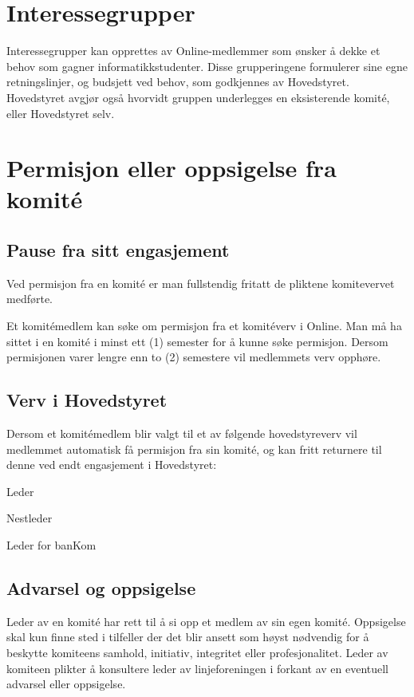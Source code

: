 \section{Interessegrupper}{
Interessegrupper kan opprettes av Online-medlemmer som ønsker å dekke et behov som gagner informatikkstudenter. Disse grupperingene formulerer sine egne retningslinjer, og budsjett ved behov, som godkjennes av Hovedstyret. Hovedstyret avgjør også hvorvidt gruppen underlegges en eksisterende komité, eller Hovedstyret selv. 
}

\section{Permisjon eller oppsigelse fra komité\newline} 

\subsection{Pause fra sitt engasjement}{
Ved permisjon fra en komité er man fullstendig fritatt de pliktene komitevervet medførte. 

Et komitémedlem kan søke om permisjon fra et komitéverv i Online. Man må ha sittet i en komité i minst ett (1) semester for å kunne søke permisjon. Dersom permisjonen varer lengre enn to (2) semestere vil medlemmets verv opphøre.
}

\subsection{Verv i Hovedstyret}{
Dersom et komitémedlem blir valgt til et av følgende hovedstyreverv vil medlemmet automatisk få permisjon fra sin komité, og kan fritt \linebreak returnere til denne ved endt engasjement i Hovedstyret:
\begin{liste}
	\item Leder
	\item Nestleder
	\item Leder for banKom
\end{liste}
}

\subsection{Advarsel og oppsigelse}{
Leder av en komité har rett til å si opp et medlem av sin egen komité. Oppsigelse skal kun finne sted i tilfeller der det blir ansett som høyst nødvendig for å beskytte komiteens samhold, initiativ, integritet eller profesjonalitet. Leder av komiteen plikter å konsultere leder av linjeforeningen i forkant av en eventuell advarsel eller oppsigelse.
}

